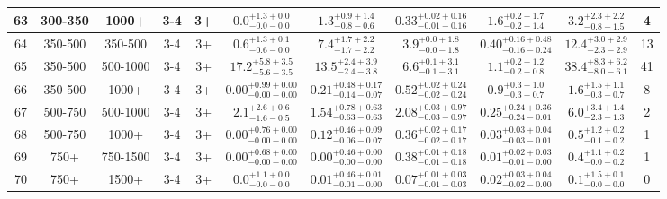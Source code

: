 \documentclass[11pt, oneside]{article}
\begin{document}
\begin{table}
{\begin{tabular}{ |c|c|c|c|c||c|c|c|c||c|c| }
63 & 300-350 & 1000+ & 3-4 & 3+ & $0.0^{+1.3+0.0}_{-0.0-0.0}$ & $1.3^{+0.9+1.4}_{-0.8-0.6}$ & $0.33^{+0.02+0.16}_{-0.01-0.16}$ & $1.6^{+0.2+1.7}_{-0.2-1.4}$ & $3.2^{+2.3+2.2}_{-0.8-1.5}$ & 4 \\ \hline
64 & 350-500 & 350-500 & 3-4 & 3+ & $0.6^{+1.3+0.1}_{-0.6-0.0}$ & $7.4^{+1.7+2.2}_{-1.7-2.2}$ & $3.9^{+0.0+1.8}_{-0.0-1.8}$ & $0.40^{+0.16+0.48}_{-0.16-0.24}$ & $12.4^{+3.0+2.9}_{-2.3-2.9}$ & 13 \\ \hline
65 & 350-500 & 500-1000 & 3-4 & 3+ & $17.2^{+5.8+3.5}_{-5.6-3.5}$ & $13.5^{+2.4+3.9}_{-2.4-3.8}$ & $6.6^{+0.1+3.1}_{-0.1-3.1}$ & $1.1^{+0.2+1.2}_{-0.2-0.8}$ & $38.4^{+8.3+6.2}_{-8.0-6.1}$ & 41 \\ \hline
66 & 350-500 & 1000+ & 3-4 & 3+ & $0.00^{+0.99+0.00}_{-0.00-0.00}$ & $0.21^{+0.48+0.17}_{-0.14-0.07}$ & $0.52^{+0.02+0.24}_{-0.02-0.24}$ & $0.9^{+0.3+1.0}_{-0.3-0.7}$ & $1.6^{+1.5+1.1}_{-0.3-0.7}$ & 8 \\ \hline
67 & 500-750 & 500-1000 & 3-4 & 3+ & $2.1^{+2.6+0.6}_{-1.6-0.5}$ & $1.54^{+0.78+0.63}_{-0.63-0.63}$ & $2.08^{+0.03+0.97}_{-0.03-0.97}$ & $0.25^{+0.24+0.36}_{-0.24-0.01}$ & $6.0^{+3.4+1.4}_{-2.3-1.3}$ & 2 \\ \hline
68 & 500-750 & 1000+ & 3-4 & 3+ & $0.00^{+0.76+0.00}_{-0.00-0.00}$ & $0.12^{+0.46+0.09}_{-0.06-0.07}$ & $0.36^{+0.02+0.17}_{-0.02-0.17}$ & $0.03^{+0.03+0.04}_{-0.03-0.01}$ & $0.5^{+1.2+0.2}_{-0.1-0.2}$ & 1 \\ \hline
69 & 750+ & 750-1500 & 3-4 & 3+ & $0.00^{+0.68+0.00}_{-0.00-0.00}$ & $0.00^{+0.46+0.00}_{-0.00-0.00}$ & $0.38^{+0.01+0.18}_{-0.01-0.18}$ & $0.01^{+0.02+0.03}_{-0.01-0.00}$ & $0.4^{+1.1+0.2}_{-0.0-0.2}$ & 1 \\ \hline
70 & 750+ & 1500+ & 3-4 & 3+ & $0.0^{+1.1+0.0}_{-0.0-0.0}$ & $0.01^{+0.46+0.01}_{-0.01-0.00}$ & $0.07^{+0.01+0.03}_{-0.01-0.03}$ & $0.02^{+0.03+0.04}_{-0.02-0.00}$ & $0.1^{+1.5+0.1}_{-0.0-0.0}$ & 0 \\ \hline
\end{tabular}}
\end{table}
\end{document}
